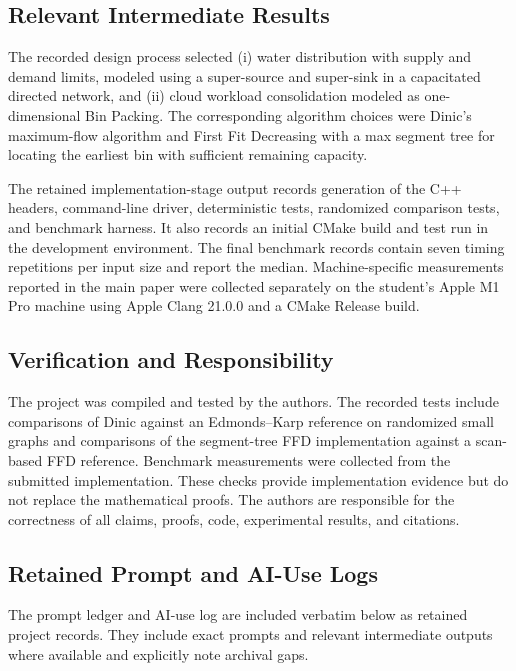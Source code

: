 \subsection{Relevant Intermediate Results}
The recorded design process selected (i) water distribution with supply and demand limits, modeled using a super-source and super-sink in a capacitated directed network, and (ii) cloud workload consolidation modeled as one-dimensional Bin Packing. The corresponding algorithm choices were Dinic's maximum-flow algorithm and First Fit Decreasing with a max segment tree for locating the earliest bin with sufficient remaining capacity.

The retained implementation-stage output records generation of the C++ headers, command-line driver, deterministic tests, randomized comparison tests, and benchmark harness. It also records an initial CMake build and test run in the development environment. The final benchmark records contain seven timing repetitions per input size and report the median. Machine-specific measurements reported in the main paper were collected separately on the student's Apple M1 Pro machine using Apple Clang 21.0.0 and a CMake Release build.

\subsection{Verification and Responsibility}
The project was compiled and tested by the authors. The recorded tests include comparisons of Dinic against an Edmonds--Karp reference on randomized small graphs and comparisons of the segment-tree FFD implementation against a scan-based FFD reference. Benchmark measurements were collected from the submitted implementation. These checks provide implementation evidence but do not replace the mathematical proofs. The authors are responsible for the correctness of all claims, proofs, code, experimental results, and citations.

\subsection{Retained Prompt and AI-Use Logs}
The prompt ledger and AI-use log are included verbatim below as retained project records. They include exact prompts and relevant intermediate outputs where available and explicitly note archival gaps.




